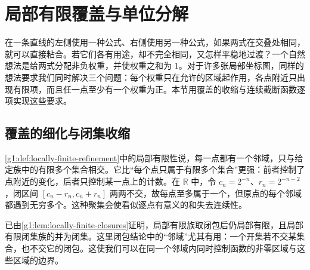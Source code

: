 
% 
% 

\section{局部有限覆盖与单位分解}
\label{g1:sec:0404}

在一条直线的左侧使用一种公式、右侧使用另一种公式，如果两式在交叠处相同，就可以直接粘合。若它们各有用途，却不完全相同，又怎样平稳地过渡？一个自然想法是给两式分配非负权重，并使权重之和为 \(1\)。对于许多张局部坐标图，同样的想法要求我们同时解决三个问题：每个权重只在允许的区域起作用，各点附近只出现有限项，而且任一点至少有一个权重为正。本节用覆盖的收缩与连续截断函数逐项实现这些要求。

\subsection{覆盖的细化与闭集收缩}
\label{g1:subsec:0404:01}

\cref{g1:def:locally-finite-refinement}中的局部有限性说，每一点都有一个邻域，只与给定族中的有限多个集合相交。它比“每个点只属于有限多个集合”更强：前者控制了点附近的变化，后者只控制某一点上的计数。在 \(\mathbb R\) 中，令 \(c_n=2^{-n}\)、\(r_n=2^{-n-2}\)，闭区间 \([c_n-r_n,c_n+r_n]\) 两两不交，故每点至多属于一个，但原点的每个邻域都遇到无穷多个。这种聚集会使看似逐点有意义的和失去连续性。

已由\cref{g1:lem:locally-finite-closures}证明，局部有限族取闭包后仍局部有限，且局部有限闭集族的并为闭集。这里闭包结论中的“邻域”尤其有用：一个开集若不交某集合，也不交它的闭包。这使我们可以在同一个邻域内同时控制函数的非零区域与这些区域的边界。

